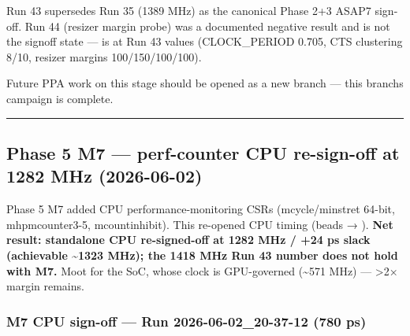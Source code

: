 \begin{record}
Run 43 supersedes Run 35 (1389 MHz) as the canonical Phase 2+3 ASAP7
sign-off. Run 44 (resizer margin probe) was a documented negative result
and is not the signoff state ---  is at Run
43 values (CLOCK\_\allowbreak{}PERIOD 0.705, CTS clustering 8/10,
resizer margins 100/\allowbreak{}150/\allowbreak{}100/\allowbreak{}100).

Future PPA work on this stage should be opened as a new branch --- this
branch\textquotesingle s campaign is complete.

\begin{center}\rule{0.5\linewidth}{0.5pt}\end{center}

\end{record}

\subsection{Phase 5 M7 --- perf-counter CPU re-sign-off at 1282 MHz
(2026-06-02)}\label{cr:run:asap7:phase-5-m7-perf-counter-cpu-re-sign-off-at-1282-mhz-2026-06-02}

\begin{record}

Phase 5 M7 added CPU performance-monitoring CSRs
(mcycle/\allowbreak{}minstret 64-bit, mhpmcounter3-5, mcountinhibit).
This re-opened CPU timing (beads  → ). \textbf{Net
result: standalone CPU re-signed-off at 1282 MHz / +24 ps slack
(achievable \textasciitilde1323 MHz); the 1418 MHz Run 43 number does
not hold with M7.} Moot for the SoC, whose clock is GPU-governed
(\textasciitilde571 MHz) --- \textgreater2× margin remains.

\end{record}

\subsubsection{\texorpdfstring{\ok{} M7 CPU sign-off --- Run
2026-06-02\_\allowbreak{}20-37-12 (780
ps)}{ M7 CPU sign-off --- Run 2026-06-02\_20-37-12 (780 ps)}}\label{cr:run:asap7:white-check-mark-m7-cpu-sign-off-run-2026-06-02-20-37-12-780-ps}

